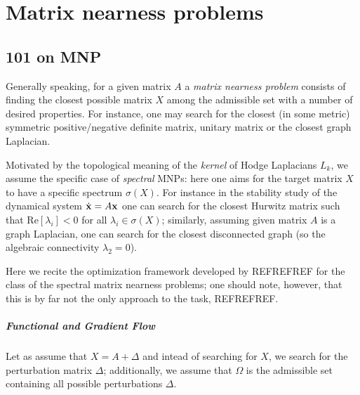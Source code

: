 \chapter{Matrix nearness problems}



\section{ 101 on MNP }

Generally speaking, for a given matrix \( A \) a \emph{matrix nearness problem} consists of finding the closest possible matrix \( X \) among the admissible set with a number of desired properties. For instance, one may search for the closest (in some metric) symmetric positive/negative definite matrix, unitary matrix or the closest graph Laplacian. 

Motivated by the topological meaning of the \emph{kernel} of Hodge Laplacians \( L_k \), we assume the specific case of \emph{spectral} MNPs: here one aims for the target matrix \( X \) to have a specific spectrum \( \sigma(X) \). For instance in the stability study of the dynamical system \( \dot{\mathbf{x}} = A \mathbf{x} \) one can search for the closest Hurwitz matrix such that \( \mathrm{Re} \left[ \lambda_i \right] < 0 \) for all \( \lambda_i \in \sigma(X) \); similarly, assuming given matrix \( A \) is a graph Laplacian, one can search for the closest disconnected graph (so the algebraic connectivity \( \lambda_2 = 0 \)).

Here we recite the optimization framework developed by REFREFREF for the class of the spectral matrix nearness problems; one should note, however, that this is by far not the only approach to the task, REFREFREF.

\paragraph{Functional and Gradient Flow}

Let as assume that \( X = A + \Delta \) and intead of searching for \( X \), we search for the perturbation matrix \( \Delta \); additionally, we assume that \( \Omega \) is the admissible set containing all possible perturbations \( \Delta \).
















